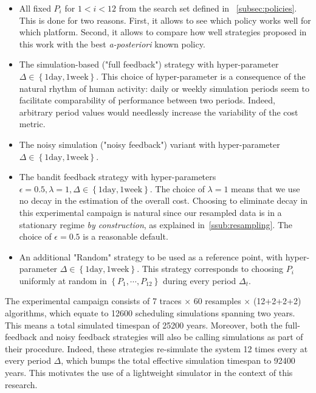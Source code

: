 \documentclass[sigconf,anonymous]{acmart}
\begin{document}
\begin{itemize}

  \item All fixed $P_i$ for $1<i<12$ from the search set defined in
    ~\ref{subsec:policies}.  This is done for two reasons. First, it allows to
    see which policy works well for which platform. Second, it allows to
    compare how well strategies proposed in this work with the best
    \textit{a-posteriori} known policy.

  \item The simulation-based ("full feedback") strategy with hyper-parameter
    $\Delta \in \left\{ 1 \text{day},1 \text{week} \right\}$. This choice of
    hyper-parameter is a consequence of the natural rhythm of human activity:
    daily or weekly simulation periods seem to facilitate comparability of
    performance between two periods. Indeed, arbitrary period values would
    needlessly increase the variability of the cost metric.

  \item The noisy simulation ("noisy feedback") variant with hyper-parameter
    $\Delta \in \left\{ 1 \text{day},1 \text{week} \right\}$.

  \item The bandit feedback strategy with hyper-parameters $\epsilon=0.5,
    \lambda=1, \Delta \in \left\{ 1 \text{day},1 \text{week} \right\}$. The
    choice of $\lambda=1$ means that we use no decay in the estimation of the
    overall cost. Choosing to eliminate decay in this experimental campaign is
    natural since our resampled data is in a stationary regime \textit{by
    construction}, as explained in~\ref{ssub:resampling}.
    The choice of $\epsilon=0.5$ is a reasonable default.

  \item An additional "Random" strategy to be used as a reference point, with
    hyper-parameter $ \Delta \in \left\{ 1 \text{day},1 \text{week} \right\}$.
    This strategy corresponds to choosing $P_i$ uniformly at random in $\left\{
      P_1 , \cdots, P_{12} \right\}$ during every period $\Delta_t$.

\end{itemize}

The experimental campaign consists of 7 traces $\times$ 60 resamples $\times$
(12+2+2+2) algorithms, which equate to 12600 scheduling simulations spanning
two years.  This means a total simulated timespan of 25200 years. Moreover,
both the full-feedback and noisy feedback strategies will also be calling
simulations as part of their procedure. Indeed, these strategies re-simulate
the system 12 times every at every period $\Delta$, which bumps the total
effective simulation timespan to 92400 years. This motivates the use of a
lightweight simulator in the context of this research.
\end{document}
